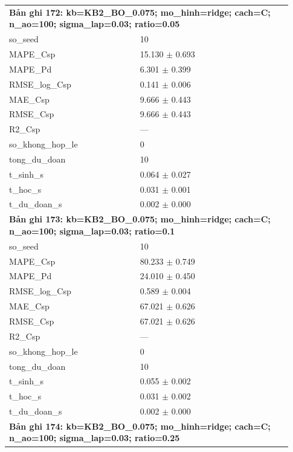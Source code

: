 \begin{longtable}{p{0.43\linewidth}p{0.50\linewidth}}
\midrule
\multicolumn{2}{p{0.95\linewidth}}{\textbf{Bản ghi 172: kb=KB2\_BO\_0.075; mo\_hinh=ridge; cach=C; n\_ao=100; sigma\_lap=0.03; ratio=0.05}} \\
so\_\allowbreak seed & 10 \\
MAPE\_\allowbreak Csp & 15.130 $\pm$ 0.693 \\
MAPE\_\allowbreak Pd & 6.301 $\pm$ 0.399 \\
RMSE\_\allowbreak log\_\allowbreak Csp & 0.141 $\pm$ 0.006 \\
MAE\_\allowbreak Csp & 9.666 $\pm$ 0.443 \\
RMSE\_\allowbreak Csp & 9.666 $\pm$ 0.443 \\
R2\_\allowbreak Csp & — \\
so\_\allowbreak khong\_\allowbreak hop\_\allowbreak le & 0 \\
tong\_\allowbreak du\_\allowbreak doan & 10 \\
t\_\allowbreak sinh\_\allowbreak s & 0.064 $\pm$ 0.027 \\
t\_\allowbreak hoc\_\allowbreak s & 0.031 $\pm$ 0.001 \\
t\_\allowbreak du\_\allowbreak doan\_\allowbreak s & 0.002 $\pm$ 0.000 \\
\midrule
\multicolumn{2}{p{0.95\linewidth}}{\textbf{Bản ghi 173: kb=KB2\_BO\_0.075; mo\_hinh=ridge; cach=C; n\_ao=100; sigma\_lap=0.03; ratio=0.1}} \\
so\_\allowbreak seed & 10 \\
MAPE\_\allowbreak Csp & 80.233 $\pm$ 0.749 \\
MAPE\_\allowbreak Pd & 24.010 $\pm$ 0.450 \\
RMSE\_\allowbreak log\_\allowbreak Csp & 0.589 $\pm$ 0.004 \\
MAE\_\allowbreak Csp & 67.021 $\pm$ 0.626 \\
RMSE\_\allowbreak Csp & 67.021 $\pm$ 0.626 \\
R2\_\allowbreak Csp & — \\
so\_\allowbreak khong\_\allowbreak hop\_\allowbreak le & 0 \\
tong\_\allowbreak du\_\allowbreak doan & 10 \\
t\_\allowbreak sinh\_\allowbreak s & 0.055 $\pm$ 0.002 \\
t\_\allowbreak hoc\_\allowbreak s & 0.031 $\pm$ 0.002 \\
t\_\allowbreak du\_\allowbreak doan\_\allowbreak s & 0.002 $\pm$ 0.000 \\
\midrule
\multicolumn{2}{p{0.95\linewidth}}{\textbf{Bản ghi 174: kb=KB2\_BO\_0.075; mo\_hinh=ridge; cach=C; n\_ao=100; sigma\_lap=0.03; ratio=0.25}} \\

\end{longtable}
